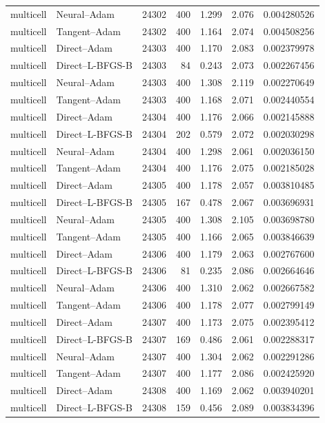 \begin{longtable}{llrrrrr}
multicell & Neural--Adam & 24302 & 400 & 1.299 & 2.076 & 0.004280526\\
multicell & Tangent--Adam & 24302 & 400 & 1.164 & 2.074 & 0.004508256\\
multicell & Direct--Adam & 24303 & 400 & 1.170 & 2.083 & 0.002379978\\
multicell & Direct--L-BFGS-B & 24303 & 84 & 0.243 & 2.073 & 0.002267456\\
multicell & Neural--Adam & 24303 & 400 & 1.308 & 2.119 & 0.002270649\\
multicell & Tangent--Adam & 24303 & 400 & 1.168 & 2.071 & 0.002440554\\
multicell & Direct--Adam & 24304 & 400 & 1.176 & 2.066 & 0.002145888\\
multicell & Direct--L-BFGS-B & 24304 & 202 & 0.579 & 2.072 & 0.002030298\\
multicell & Neural--Adam & 24304 & 400 & 1.298 & 2.061 & 0.002036150\\
multicell & Tangent--Adam & 24304 & 400 & 1.176 & 2.075 & 0.002185028\\
multicell & Direct--Adam & 24305 & 400 & 1.178 & 2.057 & 0.003810485\\
multicell & Direct--L-BFGS-B & 24305 & 167 & 0.478 & 2.067 & 0.003696931\\
multicell & Neural--Adam & 24305 & 400 & 1.308 & 2.105 & 0.003698780\\
multicell & Tangent--Adam & 24305 & 400 & 1.166 & 2.065 & 0.003846639\\
multicell & Direct--Adam & 24306 & 400 & 1.179 & 2.063 & 0.002767600\\
multicell & Direct--L-BFGS-B & 24306 & 81 & 0.235 & 2.086 & 0.002664646\\
multicell & Neural--Adam & 24306 & 400 & 1.310 & 2.062 & 0.002667582\\
multicell & Tangent--Adam & 24306 & 400 & 1.178 & 2.077 & 0.002799149\\
multicell & Direct--Adam & 24307 & 400 & 1.173 & 2.075 & 0.002395412\\
multicell & Direct--L-BFGS-B & 24307 & 169 & 0.486 & 2.061 & 0.002288317\\
multicell & Neural--Adam & 24307 & 400 & 1.304 & 2.062 & 0.002291286\\
multicell & Tangent--Adam & 24307 & 400 & 1.177 & 2.086 & 0.002425920\\
multicell & Direct--Adam & 24308 & 400 & 1.169 & 2.062 & 0.003940201\\
multicell & Direct--L-BFGS-B & 24308 & 159 & 0.456 & 2.089 & 0.003834396\\

\end{longtable}
